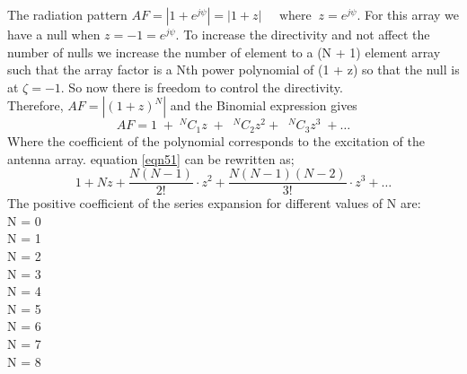 The radiation pattern $AF = |1 + e^{j\psi}| = |1 + z| \; \; \; \; \; \text{where} \; \; z =  e^{j\psi}$. For this array we have a null when $z = -1 =  e^{j\psi}$. To increase the directivity and not affect the number of nulls we increase the number of element to a (N + 1) element array such that the array factor is a Nth power polynomial of (1 + z) so that the null is at $\zeta = -1$. So now there is freedom to control the directivity.\\
Therefore, $AF = |(1 + z)^N|$ and the Binomial expression gives 
\begin{equation}
AF = 1\;  +\;  {^NC_1z} \; +\; \; {^NC_2z^2} +\; \; {^NC_3z^3} \; + \ldots
\label{eqn51}
\end{equation}
Where the coefficient of the polynomial corresponds to the excitation of the antenna array. equation \ref{eqn51} can be rewritten as;
\begin{equation}
1 + Nz + \dfrac{N(N - 1)}{2!}\cdot z^2 + \dfrac{N(N - 1)(N - 2)}{3!}\cdot z^3 + \ldots\label{eqn52}
\end{equation}
The positive coefficient of the series expansion for different values of N are:\\

N = 0\; \; \; \; \; \; \; \; \; \; \; \; \; \; \;\; \; \; \; \\

N = 1\; \; \; \; \; \; \; \; \; \; \; \; \; \; \;\; \;  \; \; \\

N = 2\; \; \; \; \; \; \; \; \; \; \; \; \; \; \; \; \;  \; \; \\

N = 3\; \; \; \; \; \; \; \; \; \; \; \; \;  \; \;  \; \;  \; \; \\

N = 4\; \; \; \; \; \; \; \; \; \; \;  \; \;  \; \;  \; \;  \; \;  \\

N = 5\; \; \; \; \; \; \; \; \;  \; \;  \; \;  \; \;  \; \;  \; \; \\

N = 6\; \; \; \; \; \; \;  \; \;  \; \;  \; \;  \; \;  \; \;  \; \; \\

N = 7\; \; \; \; \;  \; \;  \; \;  \; \;  \; \;  \; \;  \; \;  \; \; \\

N = 8\; \; \;  \; \;  \; \;  \; \;  \; \;  \; \;  \; \;  \; \;  \; \; \\

